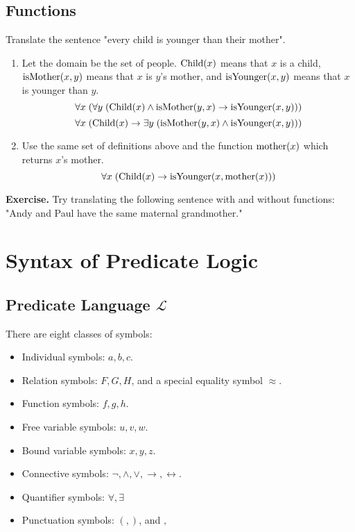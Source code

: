 \documentclass[11pt]{article}
\theoremstyle{definition}
\begin{document}
\subsection{Functions}
Translate the sentence "every child is younger than their mother". \vspace{-0.25cm}
\begin{enumerate}
    \item Let the domain be the set of people. ${\rm Child}(x)$ means that $x$ is a child, ${\rm isMother}(x, y)$ means that $x$ is $y$'s mother, and ${\rm isYounger}(x, y)$ means that $x$ is younger than $y$.
    $$\forall x \; (\forall y \; ({\rm Child}(x) \wedge {\rm isMother}(y, x) \rightarrow {\rm isYounger}(x, y)))$$
    $$\forall x \; ({\rm Child}(x) \rightarrow \exists y \; ({\rm isMother}(y, x) \wedge {\rm isYounger}(x, y)))$$
    \item Use the same set of definitions above and the function ${\rm mother}(x)$ which returns $x$'s mother.
    $$\forall x \; ({\rm Child}(x) \rightarrow {\rm isYounger}(x, {\rm mother}(x)))$$
\end{enumerate}
{\bf Exercise.} Try translating the following sentence with and without functions: "Andy and Paul have the same maternal grandmother."

\newpage
\section{Syntax of Predicate Logic}

\subsection{Predicate Language $\mathcal{L}$}
There are eight classes of symbols:\vspace{-0.25cm}
\begin{itemize}
    \item Individual symbols: $a, b, c$.
    \item Relation symbols: $F, G, H$, and a special equality symbol $\approx$.
    \item Function symbols: $f, g, h$.
    \item Free variable symbols: $u, v, w$.
    \item Bound variable symbols: $x, y, z$.
    \item Connective symbols: $\neg, \wedge, \vee, \rightarrow, \leftrightarrow$.
    \item Quantifier symbols: $\forall, \exists$
    \item Punctuation symbols: $(, )$, and $,$
\end{itemize}
\end{document}
